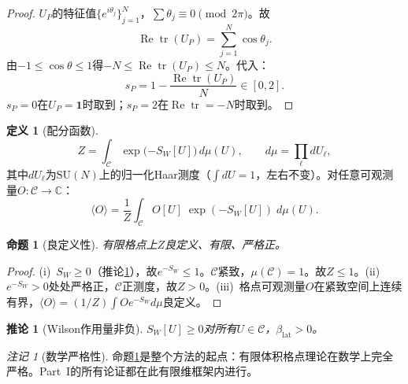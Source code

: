 \documentclass[12pt,a4paper]{article}
\theoremstyle{plain}
\newtheorem{corollary}[theorem]{推论}
\newtheorem{proposition}[theorem]{命题}
\theoremstyle{definition}
\newtheorem{definition}[theorem]{定义}
\theoremstyle{remark}
\newtheorem{remark}[theorem]{注记}
\begin{document}
\begin{proof}
$U_P$的特征值$\{e^{i\theta_j}\}_{j=1}^N$，$\sum\theta_j\equiv 0\pmod{2\pi}$。故
\begin{equation}
\operatorname{Re}\operatorname{tr}(U_P) = \sum_{j=1}^N \cos\theta_j.
\end{equation}
由$-1\leq\cos\theta\leq 1$得$-N\leq\operatorname{Re}\operatorname{tr}(U_P)\leq N$。代入：
\begin{equation}
s_P = 1 - \frac{\operatorname{Re}\operatorname{tr}(U_P)}{N} \in [0,2].
\end{equation}
$s_P=0$在$U_P=\mathbf{1}$时取到；$s_P=2$在$\operatorname{Re}\operatorname{tr}=-N$时取到。
\end{proof}

\begin{definition}[配分函数]\label{def:Z}
\begin{equation}\label{eq:Z}
Z = \int_{\mathcal{C}} \exp\!\bigl({-S_W[U]}\bigr)\,d\mu(U), \qquad d\mu = \prod_\ell dU_\ell,
\end{equation}
其中$dU_\ell$为$\mathrm{SU}(N)$上的归一化Haar测度（$\int dU=1$，左右不变）。对任意可观测量$O:\mathcal{C}\to\mathbb{C}$：
\begin{equation}
\langle O \rangle = \frac{1}{Z}\int_{\mathcal{C}} O[U]\;\exp({-S_W[U]})\;d\mu(U).
\end{equation}
\end{definition}

\begin{proposition}[良定义性]\label{prop:wd}
有限格点上$Z$良定义、有限、严格正。
\end{proposition}

\begin{proof}
(i)~$S_W\geq 0$（推论\ref{cor:SWnonneg}），故$e^{-S_W}\leq 1$。$\mathcal{C}$紧致，$\mu(\mathcal{C})=1$。故$Z\leq 1$。(ii)~$e^{-S_W}>0$处处严格正，$\mathcal{C}$正测度，故$Z>0$。(iii)~格点可观测量$O$在紧致空间上连续有界，$\langle O\rangle=(1/Z)\int Oe^{-S_W}d\mu$良定义。
\end{proof}

\begin{corollary}[Wilson作用量非负]\label{cor:SWnonneg}
$S_W[U]\geq 0$对所有$U\in\mathcal{C}$，$\beta_{\mathrm{lat}}>0$。
\end{corollary}

\begin{remark}[数学严格性]
命题\ref{prop:wd}是整个方法的起点：有限体积格点理论在数学上完全严格。Part~I的所有论证都在此有限维框架内进行。
\end{remark}
\end{document}
